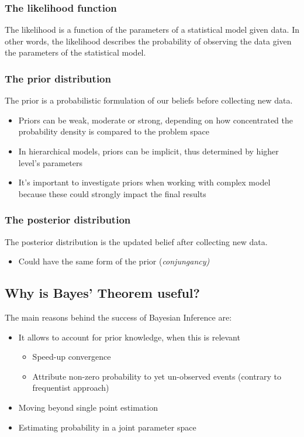 \documentclass[11pt]{beamer}
\begin{document}
\begin{frame}
	\frametitle{The likelihood function}
	The likelihood is a function of the parameters of a statistical model given data. In other words, the likelihood describes the probability of observing the data given the parameters of the statistical model.
\end{frame}

\begin{frame}
	\frametitle{The prior distribution}
	The prior is a probabilistic formulation of our beliefs before collecting new data.
	\begin{itemize}
		\item Priors can be weak, moderate or strong, depending on how concentrated the probability density is compared to the problem space
		\item In hierarchical models, priors can be implicit, thus determined by higher level's parameters
		\item It's important to investigate priors when working with complex model because these could strongly impact the final results
	\end{itemize}

\end{frame}

\begin{frame}
	\frametitle{The posterior distribution}
	The posterior distribution is the updated belief after collecting new data.
	\begin{itemize}
		\item Could have the same form of the prior (\it{conjungancy})
	\end{itemize}
\end{frame}

\subsection{Why is Bayes' Theorem useful?}
\begin{frame}
	The main reasons behind the success of Bayesian Inference are:
	\begin{itemize}
		\item It allows to account for prior knowledge, when this is relevant
		\begin{itemize}
			\item Speed-up convergence
			\item Attribute non-zero probability to yet un-observed events (contrary to frequentist approach)
		\end{itemize}
		\item Moving beyond single point estimation
		\item Estimating probability in a joint parameter space
	\end{itemize}		
\end{frame}
\end{document}
